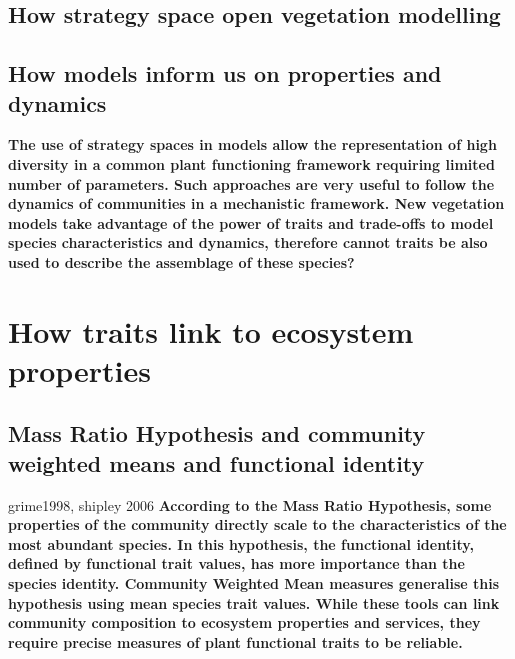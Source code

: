 \subsection{How strategy space open vegetation modelling}



\subsection{How models inform us on properties and dynamics}

\textbf{The use of strategy spaces in models allow the representation of high diversity in a common plant functioning framework requiring limited number of parameters. Such approaches are very useful to follow the dynamics of communities in a mechanistic framework. New vegetation models take advantage of the power of traits and trade-offs to model species characteristics and dynamics, therefore cannot traits be also used to describe the assemblage of these species? }

\section{How traits link to ecosystem properties}

\subsection{Mass Ratio Hypothesis and community weighted means and functional identity}

grime1998, shipley 2006
\textbf{According to the Mass Ratio Hypothesis, some properties of the community directly scale to the characteristics of the most abundant species. In this hypothesis, the functional identity, defined by functional trait values, has more importance than the species identity. Community Weighted Mean measures generalise this hypothesis using mean species trait values. While these tools can link community composition to ecosystem properties and services, they require precise measures of plant functional traits to be reliable.}

